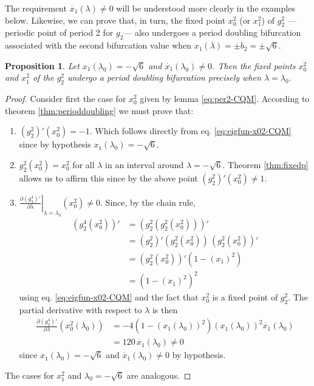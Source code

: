 \documentclass[10pt,twoside,titlepage]{book}
\numberwithin{equation}{chapter}
\numberwithin{figure}{chapter}
\numberwithin{table}{chapter}
\theoremstyle{plain}%
\newtheorem{prop}[thm]{Proposition}
\theoremstyle{definition}
\theoremstyle{remark}
\begin{document}
The requirement $\dot{x_1}(\lambda)\neq 0$ will be understood more clearly in the examples below. Likewise, we can prove that, in turn, the fixed point $x_0^2$ (or $x_1^2$) of $g_2^2$ ---periodic point of period 2 for $g_2$--- also undergoes a period doubling bifurcation associated with the second bifurcation value when $x_1(\lambda)=\pm b_2=\pm\sqrt{6}$.

\begin{prop}
	\label{prop:CQM-per2bif-b2}
	Let $x_1(\lambda_0)=-\sqrt{6}$ and $\dot{x_1}(\lambda_0)\neq 0$. Then the fixed points $x_0^2$ and $x_1^2$ of the $g_2^2$ undergo a period doubling bifurcation precisely when $\lambda=\lambda_0$.
\end{prop}
\begin{proof}
	Consider first the case for $x_0^2$ given by lemma \ref{eq:per2-CQM}. According to theorem \ref{thm:perioddoubling} we must prove that:
	\begin{enumerate}
		\item $\left(g_2^2\right)'(x_0^2)=-1$. Which follows directly from eq. \ref{eq:eigfun-x02-CQM} since by hypothesis $x_1(\lambda_0)=-\sqrt{6}$.
		\item $g_2^2(x_0^2)=x_0^2$ for all $\lambda$ in an interval around $\lambda=-\sqrt{6}$. Theorem \ref{thm:fixedp} allows us to affirm this since by the above point $\left(g_2^2\right)'(x_0^2)\neq1$.
		\item $\left.\frac{\partial\left(g^4_2\right)'}{\partial\lambda}\right|_{\lambda=\lambda_0}(x_0^2)\neq 0$. Since, by the chain rule,
		\begin{equation*}
			\begin{aligned}
				\left(g_2^4(x_0^2)\right)' 	&= \left(g_2^2\left(g_2^2(x_0^2)\right)\right)'\\
				&= \left(g_2^2\right)'\left(g_2^2(x_0^2)\right)\,\left(g_2^2(x_0^2)\right)'\\
				&= \left(g_2^2(x_0^2)\right)'\left(1-(x_1)^2\right)\\
				&=  \left(1-(x_1)^2\right)^2
			\end{aligned}
		\end{equation*}
		using eq. \eqref{eq:eigfun-x02-CQM} and the fact that $x_0^2$ is a fixed point of $g_2^2$. The partial derivative with respect to $\lambda$ is then
		\begin{equation*}
			\begin{aligned}
				\frac{\partial\left(g^4_2\right)'}{\partial\lambda}(x_0^2(\lambda_0)) &= -4\left(1-(x_1(\lambda_0))^2\right)(x_1(\lambda_0))^2\dot{x_1}(\lambda_0)\\
				&= 120\,\dot{x_1}(\lambda_0)\neq 0
			\end{aligned}
		\end{equation*}
		since $x_1(\lambda_0)=-\sqrt{6}$ and $\dot{x_1}(\lambda_0)\neq0$ by hypothesis.
	\end{enumerate}
	The cases for $x_1^2$ and $\lambda_0=-\sqrt{6}$ are analogous.
\end{proof}
\end{document}
